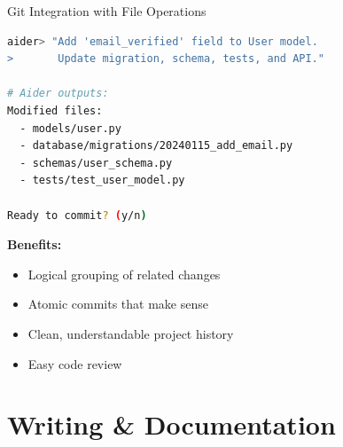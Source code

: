 \documentclass[aspectratio=169,11pt]{beamer}
\begin{document}
\begin{frame}[fragile]{Git Integration with File Operations}
    \begin{lstlisting}[language=bash, basicstyle=\ttfamily\small, title=Automatic Staging for Related Changes]
aider> "Add 'email_verified' field to User model.
>       Update migration, schema, tests, and API."

# Aider outputs:
Modified files:
  - models/user.py
  - database/migrations/20240115_add_email.py
  - schemas/user_schema.py
  - tests/test_user_model.py

Ready to commit? (y/n)
    \end{lstlisting}

    \vspace{0.3cm}
    \textbf{Benefits:}
    \begin{itemize}
        \item Logical grouping of related changes
        \item Atomic commits that make sense
        \item Clean, understandable project history
        \item Easy code review
    \end{itemize}

\end{frame}

\section{Writing \& Documentation}
\end{document}
